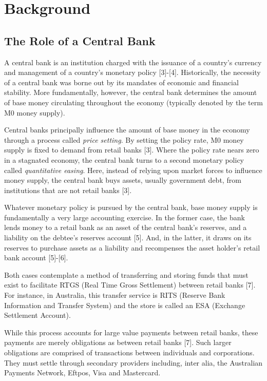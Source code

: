 \section{Background}

\subsection{The Role of a Central Bank}

A central bank is an institution charged with the issuance of a country's currency and management of a country's monetary policy [3]-[4]. Historically, the necessity of a central bank was borne out by its mandates of economic and financial stability. More fundamentally, however, the central bank determines the amount of base money circulating throughout the economy (typically denoted by the term M0 money supply).

Central banks principally influence the amount of base money in the economy through a process called \textit{price setting}. By setting the policy rate, M0 money supply is fixed to demand from retail banks [3]. Where the policy rate nears zero in a stagnated economy, the central bank turns to a second monetary policy called \textit{quantitative easing}. Here, instead of relying upon market forces to influence money supply, the central bank buys assets, usually government debt, from institutions that are not retail banks [3].

Whatever monetary policy is pursued by the central bank, base money supply is fundamentally a very large accounting exercise. In the former case, the bank lends money to a retail bank as an asset of the central bank's reserves, and a liability on the debtee's reserves account [5]. And, in the latter, it draws on its reserves to purchase assets as a liability and recompenses the asset holder's retail bank account [5]-[6].

Both cases contemplate a method of transferring and storing funds that must exist to facilitate RTGS (Real Time Gross Settlement) between retail banks [7]. For instance, in Australia, this transfer service is RITS (Reserve Bank Information and Transfer System) and the store is called an ESA (Exchange Settlement Account). 

While this process accounts for large value payments between retail banks, these payments are merely obligations as between retail banks [7]. Such larger obligations are comprised of transactions between individuals and corporations. They must settle through secondary providers including, inter alia, the Australian Payments Network, Eftpos, Visa and Mastercard.

